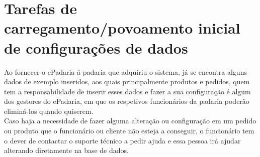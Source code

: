 \section{Tarefas de carregamento/povoamento inicial de configurações de dados}
Ao fornecer o ePadaria á padaria que adquiriu o sistema, já se encontra alguns dados de exemplo inseridos, aos quais principalmente produtos e pedidos, quem tem a responsabilidade de inserir esses dados e fazer a sua configuração é algum dos gestores do ePadaria, em que os respetivos funcionários da padaria poderão eliminá-los quando quiserem. \\
Caso haja a necessidade de fazer alguma alteração ou configuração em um pedido ou produto que o funcionário ou cliente não esteja a conseguir, o funcionário tem o dever de contactar o suporte técnico a pedir ajuda e essa pessoa irá ajudar alterando diretamente na base de dados.

